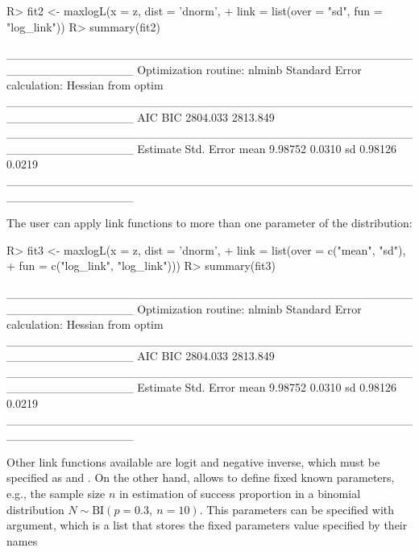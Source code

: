 \documentclass[nojss]{jss}
\begin{document}
\begin{Schunk}
\begin{Sinput}
R> fit2 <- maxlogL(x = z, dist = 'dnorm',
+                  link = list(over = "sd", fun = "log_link"))
R> summary(fit2)
\end{Sinput}
\begin{Soutput}
_______________________________________________________________
Optimization routine: nlminb 
Standard Error calculation: Hessian from optim 
_______________________________________________________________
       AIC      BIC
  2804.033 2813.849
_______________________________________________________________
     Estimate  Std. Error
mean   9.98752     0.0310
sd     0.98126     0.0219
_______________________________________________________________
\end{Soutput}
\end{Schunk}

The user can apply link functions to more than one parameter of the distribution:

\begin{Schunk}
\begin{Sinput}
R> fit3 <- maxlogL(x = z, dist = 'dnorm',
+                  link = list(over = c("mean", "sd"),
+                              fun = c("log_link", "log_link")))
R> summary(fit3)
\end{Sinput}
\begin{Soutput}
_______________________________________________________________
Optimization routine: nlminb 
Standard Error calculation: Hessian from optim 
_______________________________________________________________
       AIC      BIC
  2804.033 2813.849
_______________________________________________________________
     Estimate  Std. Error
mean   9.98752     0.0310
sd     0.98126     0.0219
_______________________________________________________________
\end{Soutput}
\end{Schunk}

Other link functions available are logit and negative inverse, which must be specified as  and . On the other hand,  allows to define fixed known parameters, e.g., the sample size $n$ in estimation of success proportion in a binomial distribution $N \sim \text{BI}(p=0.3, \: n=10)$. This parameters can be specified with  argument, which is a list that stores the fixed parameters value specified by their names
\end{document}
